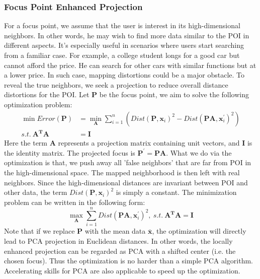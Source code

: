 \subsubsection{Focus Point Enhanced Projection}
For a focus point, we assume that the user is interest in its high-dimensional neighbors. In other words, he may wish to find more data similar to the POI in different aspects. It's especially useful in scenarios where users start searching from a familiar case. For example, a college student longs for a good car but cannot afford the price. He can search for other cars with similar functions but at a lower price. In such case, mapping distortions could be a major obstacle. To reveal the true neighbors, we seek a projection to reduce overall distance distortions for the POI. Let $\mathbf{P}$ be the focus point, we aim to solve the following optimization problem:
\begin{equation}
\begin{split}
\min Error(\mathbf{P}) &= \min_{\mathbf{A}}  \sum\limits_{i=1}^{n}(Dist(\mathbf{P}, \mathbf{x}_{i})^{2} - Dist(\mathbf{PA}, \mathbf{x}_{i}^{\prime})^{2})\\ 
s.t.\ \mathbf{A^{T}A} &= \mathbf{I}
\end{split}
\end{equation}
Here the term $\mathbf{A}$ represents a projection matrix containing unit vectors, and $\mathbf{I}$ is the identity matrix. The projected focus is $\mathbf{P^{\prime}} = \mathbf{PA}$. What we do via the optimization is that, we push away all 'false neighbors' that are far from POI in the high-dimensional space. The mapped neighborhood is then left with real neighbors. Since the high-dimensional distances are invariant between POI and other data, the term $Dist(\mathbf{P}, \mathbf{x}_{i})^{2}$ is simply a constant. The minimization problem can be written in the following form:
\begin{equation}
\label{equation:center-shiftedPCA}
\max_{\mathbf{A}}  \sum\limits_{i=1}^{n}Dist(\mathbf{PA}, \mathbf{x}_{i}^{\prime})^{2},\ s.t.\ \mathbf{A^{T}A} = \mathbf{I}
\end{equation}
Note that if we replace $\mathbf{P}$ with the mean data $\mathbf{\bar{x}}$, the optimization will directly lead to PCA projection in Euclidean distances. In other words, the locally enhanced projection can be regarded as PCA with a shifted center (i.e. the chosen focus). Thus the optimization is no harder than a simple PCA algorithm. Accelerating skills for PCA are also applicable to speed up the optimization.

